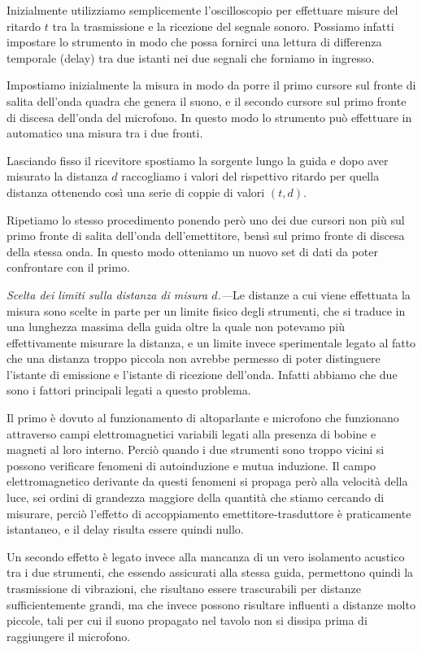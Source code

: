 \documentclass[
    rmp,
    reprint, 
    superscriptaddress, 
    altaffilletter, 
    amsmath, 
    amssymb, 
    a4paper,
    varvw]{revtex4-2}
\begin{document}
Inizialmente utilizziamo semplicemente l'oscilloscopio per effettuare misure del ritardo $t$ tra la trasmissione e la ricezione del segnale sonoro. Possiamo infatti impostare lo strumento in modo che possa fornirci una lettura di differenza temporale (delay) tra due istanti nei due segnali che forniamo in ingresso. 

Impostiamo inizialmente la misura in modo da porre il primo cursore sul fronte di salita dell'onda quadra che genera il suono, e il secondo cursore sul primo fronte di discesa dell'onda del microfono. In questo modo lo strumento può effettuare in automatico una misura tra i due fronti. 

Lasciando fisso il ricevitore spostiamo la sorgente lungo la guida e dopo aver misurato la distanza $d$ raccogliamo i valori del rispettivo ritardo per quella distanza ottenendo così una serie di coppie di valori $(t,d)$.

Ripetiamo lo stesso procedimento ponendo però uno dei due cursori non più sul primo fronte di salita dell'onda dell'emettitore, bensì sul primo fronte di discesa della stessa onda. In questo modo otteniamo un nuovo set di dati da poter confrontare con il primo. 

\textit{Scelta dei limiti sulla distanza di misura $d$.---}Le distanze a cui viene effettuata la misura sono scelte in parte per un limite fisico degli strumenti, che si traduce in una lunghezza massima della guida oltre la quale non potevamo più effettivamente misurare la distanza, e un limite invece sperimentale legato al fatto che una distanza troppo piccola non avrebbe permesso di poter distinguere l'istante di emissione e l'istante di ricezione dell'onda. Infatti abbiamo che due sono i fattori principali legati a questo problema. 

Il primo è dovuto al funzionamento di altoparlante e microfono che funzionano attraverso campi elettromagnetici variabili legati alla presenza di bobine e magneti al loro interno. Perciò quando i due strumenti sono troppo vicini si possono verificare fenomeni di autoinduzione e mutua induzione. Il campo elettromagnetico derivante da questi fenomeni si propaga però alla velocità della luce, sei ordini di grandezza maggiore della quantità che stiamo cercando di misurare, perciò l'effetto di accoppiamento emettitore-trasduttore è praticamente istantaneo, e il delay risulta essere quindi nullo. 

Un secondo effetto è legato invece alla mancanza di un vero isolamento acustico tra i due strumenti, che essendo assicurati alla stessa guida, permettono quindi la trasmissione di vibrazioni, che risultano essere trascurabili per distanze sufficientemente grandi, ma che invece possono risultare influenti a distanze molto piccole, tali per cui il suono propagato nel tavolo non si dissipa prima di raggiungere il microfono. 
\end{document}
